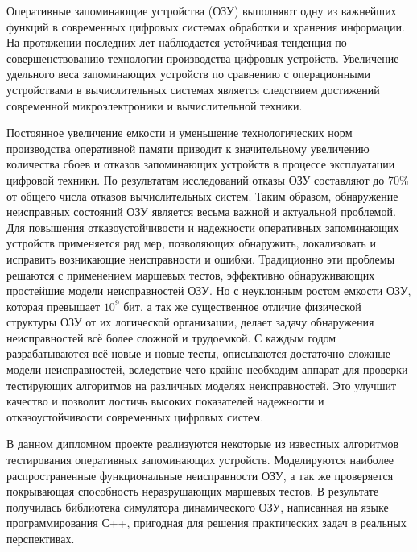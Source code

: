 \label{sec:intro}

Оперативные запоминающие устройства (ОЗУ) выполняют одну из важнейших функций в современных цифровых системах обработки и хранения информации. На протяжении последних лет наблюдается устойчивая тенденция по совершенствованию технологии производства цифровых устройств. Увеличение удельного веса запоминающих устройств по сравнению с операционными устройствами в вычислительных системах является следствием достижений современной микроэлектроники и вычислительной техники. 

Постоянное увеличение емкости и уменьшение технологических норм производства оперативной памяти приводит к значительному увеличению количества сбоев и отказов запоминающих устройств в процессе эксплуатации цифровой техники. По результатам исследований отказы ОЗУ составляют до 70\% от общего числа отказов вычислительных систем. Таким образом, обнаружение неисправных состояний ОЗУ является весьма важной и актуальной проблемой. Для повышения отказоустойчивости и надежности оперативных запоминающих устройств применяется ряд мер, позволяющих обнаружить, локализовать и исправить возникающие неисправности и ошибки. Традиционно эти проблемы решаются с применением маршевых тестов, эффективно обнаруживающих простейшие модели неисправностей ОЗУ. Но с неуклонным ростом емкости ОЗУ, которая превышает $10^9$ бит, а так же существенное отличие физической структуры ОЗУ от их логической организации, делает задачу обнаружения неисправностей всё более сложной и трудоемкой. С каждым годом разрабатываются всё новые и новые тесты, описываются достаточно сложные модели неисправностей, вследствие чего крайне необходим аппарат для проверки тестирующих алгоритмов на различных  моделях неисправностей. Это улучшит качество и позволит достичь высоких показателей надежности и отказоустойчивости современных цифровых систем.

В данном дипломном проекте реализуются некоторые из известных алгоритмов тестирования оперативных запоминающих устройств. Моделируются наиболее распространенные функциональные неисправности ОЗУ, а так же проверяется покрывающая способность неразрушающих маршевых тестов.
В результате получилась библиотека симулятора динамического ОЗУ, написанная на языке программирования С++, пригодная для решения практических задач в реальных перспективах.
